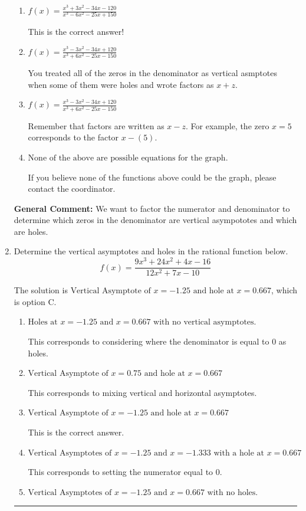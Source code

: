 \documentclass{extbook}[14pt]
\newcommand{\litem}[1]{\item #1

\rule{\textwidth}{0.4pt}}
\begin{document}
\begin{enumerate}
{\begin{enumerate}[label=\Alph*.]
You treated all of the zeros in the denominator as vertical asymptotes when some of them were holes!
\item \( f(x)=\frac{x^{3} +3 x^{2} -34 x -120}{x^{3} -6 x^{2} -25 x + 150} \)

This is the correct answer!
\item \( f(x)=\frac{x^{3} -3 x^{2} -34 x + 120}{x^{3} +6 x^{2} -25 x -150} \)

You treated all of the zeros in the denominator as vertical asmptotes when some of them were holes and wrote factors as $x+z$.
\item \( f(x)=\frac{x^{3} -3 x^{2} -34 x + 120}{x^{3} +6 x^{2} -25 x -150} \)

Remember that factors are written as $x-z$. For example, the zero $x=5$ corresponds to the factor $x-(5)$.
\item \( \text{None of the above are possible equations for the graph.} \)

If you believe none of the functions above could be the graph, please contact the coordinator.
\end{enumerate}

\textbf{General Comment:} We want to factor the numerator and denominator to determine which zeros in the denominator are vertical asympototes and which are holes.
}
\litem{
Determine the vertical asymptotes and holes in the rational function below.
\[ f(x) = \frac{9x^{3} +24 x^{2} +4 x -16}{12x^{2} +7 x -10} \]

The solution is \( \text{Vertical Asymptote of } x = -1.25 \text{ and hole at } x = 0.667 \), which is option C.\begin{enumerate}[label=\Alph*.]
\item \( \text{Holes at } x = -1.25 \text{ and } x = 0.667 \text{ with no vertical asymptotes.} \)

This corresponds to considering where the denominator is equal to 0 as holes.
\item \( \text{Vertical Asymptote of } x = 0.75 \text{ and hole at } x = 0.667 \)

This corresponds to mixing vertical and horizontal asymptotes.
\item \( \text{Vertical Asymptote of } x = -1.25 \text{ and hole at } x = 0.667 \)

This is the correct answer.
\item \( \text{Vertical Asymptotes of } x = -1.25 \text{ and } x = -1.333 \text{ with a hole at } x = 0.667 \)

This corresponds to setting the numerator equal to 0.
\item \( \text{Vertical Asymptotes of } x = -1.25 \text{ and } x = 0.667 \text{ with no holes.} \)


\end{enumerate}}
\end{enumerate}
\end{document}
